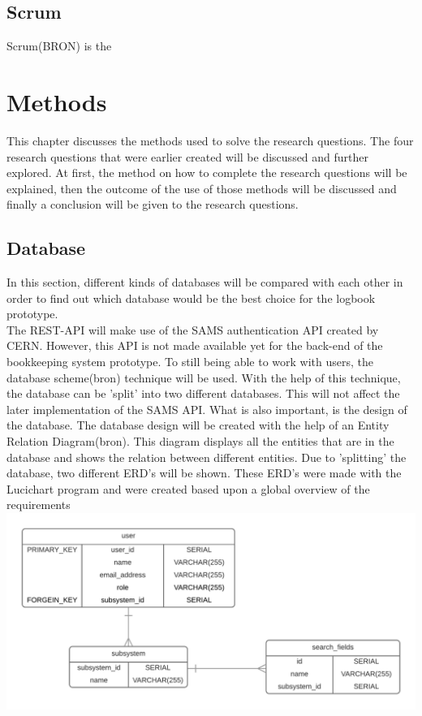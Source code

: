 \documentclass[paper=a4, fontsize=11pt,twoside]{scrartcl}	%
\begin{document}
\subsection{Scrum}
Scrum(BRON) is the 

\newpage


\section{Methods}
This chapter discusses the methods used to solve the research questions. The four research questions that were earlier created will be discussed and further explored. At first, the method on how to complete the research questions will be explained, then the outcome of the use of those methods will be discussed and finally a conclusion will be given to the research questions. 

\newpage
\subsection{Database}
In this section, different kinds of databases will be compared with each other in order to find out which database would be the best choice for the logbook prototype. \\
The REST-API will make use of the SAMS authentication API created by CERN. However, this API is not made available yet for the back-end of the bookkeeping system prototype. To still being able to work with users, the database scheme(bron) technique will be used. With the help of this technique, the database can be 'split' into two different databases. This will not affect the later implementation of the SAMS API.
What is also important, is the design of the database. The database design will be created with the help of an Entity Relation Diagram(bron). This diagram displays all the entities that are in the database and shows the relation between different entities. Due to 'splitting' the database, two different ERD's will be shown. These ERD's were made with the Lucichart program and were created based upon a global overview of the requirements \\
\includegraphics[scale=0.9]{ERDUser}
\end{document}
